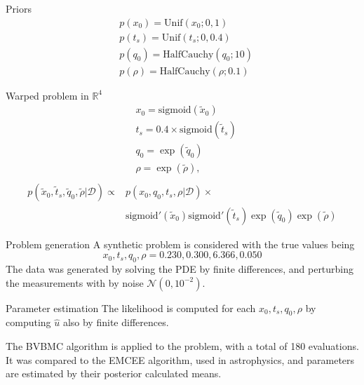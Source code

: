 \documentclass{beamer}
\begin{document}
\begin{frame}
\begin{block}{Priors}
\begin{equation*}
\begin{split}
& p(x_0) = \text{Unif}(x_0;0,1) \\ 
& p(t_s) = \text{Unif}(t_s;0,0.4) \\
& p(q_0) = \text{HalfCauchy}(q_0;10) \\ 
& p(\rho) = \text{HalfCauchy}(\rho;0.1)
\end{split}
\end{equation*}
\end{block}

\begin{block}{Warped problem in $\mathbb{R}^4$}
\begin{equation*}
\begin{split}
& x_0 = \text{sigmoid}(\tilde{x}_0) \\
& t_s = 0.4 \times \text{sigmoid}(\tilde{t}_s) \\
& q_0 = \exp(\tilde{q}_0) \\
& \rho = \exp(\tilde{\rho}), \\
\end{split}
\end{equation*}
\begin{equation*}
\begin{split}
p(\tilde{x}_0,\tilde{t}_s,\tilde{q}_0,\tilde{\rho}|\mathcal{D}) \propto & p(x_0,q_0,t_s,\rho|\mathcal{D}) \times \\ & \text{sigmoid}'(\tilde{x}_0) \text{sigmoid}'(\tilde{t}_s) \exp(\tilde{q}_0) \exp(\tilde{\rho})
\end{split}
\end{equation*}
\end{block}
\end{frame}
\begin{frame}
\begin{block}{Problem generation}
A synthetic problem is considered with the true values being
\begin{equation*}
x_0,t_s,q_0,\rho = 0.230,0.300,6.366,0.050
\end{equation*}
The data was generated by solving the PDE by finite differences, and perturbing the measurements with by noise $\mathcal{N}(0,10^{-2})$.
\end{block}
\begin{block}{Parameter estimation}
	The likelihood is computed for each $x_0,t_s,q_0,\rho$ by computing $\hat{u}$ also by finite differences.
	
	The BVBMC algorithm is applied to the problem, with a total of 180 evaluations. It was compared to the EMCEE algorithm, used in astrophysics, and parameters are estimated by their posterior calculated means.
\end{block}
\end{frame}
\end{document}

